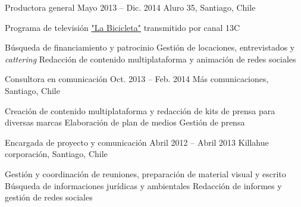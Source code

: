 \begin{joblist}[13.2][7.8][3.4]
{\begin{itemize}
        \end{itemize}
    }



\item[Productora general]{Mayo 2013 -- Dic. 2014}
    {
    Aluro 35, Santiago, Chile
    }
    {
        Programa de televisión \href{http://www.13.cl/c/programas/la-bicicleta}{"La Bicicleta"} transmitido por canal 13C \\
        \iftbftiny \vspace{-0.5cm} \fi
        \begin{itemize}
            \iftbftiny \setlength\itemsep{-3pt} \fi
            \cvitem[\checkmark] Búsqueda de financiamiento y patrocinio
            \cvitem[\checkmark] Gestión de locaciones, entrevistados y \textit{cattering}
            \cvitem[\checkmark] Redacción de contenido multiplataforma y animación de redes sociales
        \end{itemize}
    }



\item[Consultora en comunicación]{Oct. 2013 -- Feb. 2014 }
    {
    Más comunicaciones, Santiago, Chile
    }
    {
        \iftbftiny \vspace{-0.5cm} \fi
        \begin{itemize}
            \iftbftiny \setlength\itemsep{-3pt} \fi
            \cvitem[\checkmark]  Creación de contenido multiplataforma y redacción de kits de prensa para diversas marcas
            \cvitem[\checkmark]  Elaboración de plan de medios
            \cvitem[\checkmark]  Gestión de prensa
        \end{itemize}
    }

\item[Encargada de proyecto y comunicación]{Abril 2012 -- Abril 2013 \vspace{0.2cm}}
    {
    Killahue corporación, Santiago, Chile
    }
    {

        \iftbftiny \vspace{-0.5cm} \fi
        \begin{itemize}
            \iftbftiny \setlength\itemsep{-3pt} \fi
            \cvitem[\checkmark] Gestión y coordinación de reuniones, preparación de material visual y escrito
            \cvitem[\checkmark] Búsqueda de informaciones jurídicas y ambientales
            \cvitem[\checkmark] Redacción de informes y gestión de redes sociales
        \end{itemize}
    }




\end{joblist}


